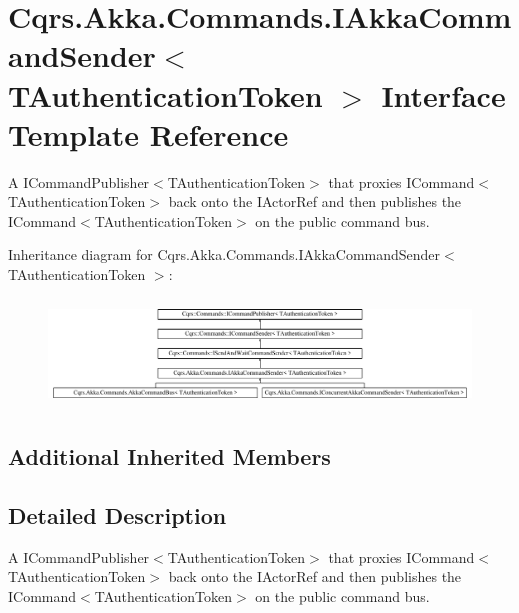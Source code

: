 \hypertarget{interfaceCqrs_1_1Akka_1_1Commands_1_1IAkkaCommandSender}{}\section{Cqrs.\+Akka.\+Commands.\+I\+Akka\+Command\+Sender$<$ T\+Authentication\+Token $>$ Interface Template Reference}
\label{interfaceCqrs_1_1Akka_1_1Commands_1_1IAkkaCommandSender}


A I\+Command\+Publisher$<$\+T\+Authentication\+Token$>$ that proxies I\+Command$<$\+T\+Authentication\+Token$>$ back onto the I\+Actor\+Ref and then publishes the I\+Command$<$\+T\+Authentication\+Token$>$ on the public command bus.  


Inheritance diagram for Cqrs.\+Akka.\+Commands.\+I\+Akka\+Command\+Sender$<$ T\+Authentication\+Token $>$\+:\begin{figure}[H]
\begin{center}
\leavevmode
\includegraphics[height=2.898551cm]{interfaceCqrs_1_1Akka_1_1Commands_1_1IAkkaCommandSender}
\end{center}
\end{figure}
\subsection*{Additional Inherited Members}


\subsection{Detailed Description}
A I\+Command\+Publisher$<$\+T\+Authentication\+Token$>$ that proxies I\+Command$<$\+T\+Authentication\+Token$>$ back onto the I\+Actor\+Ref and then publishes the I\+Command$<$\+T\+Authentication\+Token$>$ on the public command bus. 

